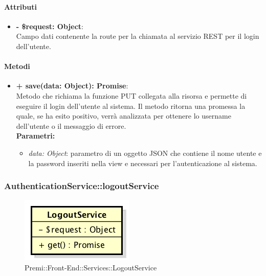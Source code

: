 		\paragraph{Attributi}
		\begin{itemize}
			\item \textbf{- \$request: Object}:\\
			Campo dati contenente la route per la chiamata al servizio \gls{REST} per il login dell'utente.
		\end{itemize}	
		
		\paragraph{Metodi}
		\begin{itemize}
			\item \textbf{+ save(data: Object): Promise}:\\
			Metodo che richiama la funzione PUT collegata alla risorsa e permette di eseguire il login dell'utente al sistema. Il metodo ritorna una promessa la quale, se ha esito positivo, verrà analizzata per ottenere lo username dell'utente o il messaggio di errore. \\
			\textbf{Parametri:}\\
			\begin{itemize}
				\item \textit{data: Object}: parametro di un oggetto \gls{JSON} che contiene il nome utente e la password inseriti nella view e necessari per l'autenticazione al sistema.
			\end{itemize}
		\end{itemize}
\newpage
		
		
		\subsubsection{AuthenticationService::logoutService}
		\begin{figure}[h]
			\centering
				\includegraphics[width=0.4\linewidth]{img/premi_front_end_services_logoutservice}
			\caption[Premi::Front-End::Services::LogoutService]{Premi::Front-End::Services::LogoutService}
		\end{figure}
		
